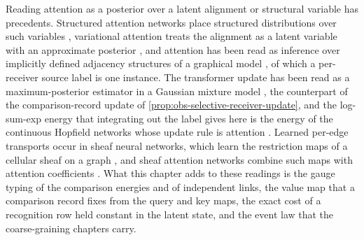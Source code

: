 Reading attention as a posterior over a latent alignment or structural
variable has precedents. Structured attention networks place structured
distributions over such variables \citep{Kim2017StructuredAttention},
variational attention treats the alignment as a latent variable with an
approximate posterior \citep{Deng2018LatentAlignment}, and attention has been
read as inference over implicitly defined adjacency structures of a graphical
model \citep{Singh2023ImplicitStructuralInference}, of which a per-receiver
source label is one instance. The transformer update has been read as a
maximum-posterior estimator in a Gaussian mixture model
\citep{Movellan2020ProbabilisticTransformers}, the counterpart of the
comparison-record update of \cref{prop:obs-selective-receiver-update}, and the
log-sum-exp energy that integrating out the label gives here is the energy of
the continuous Hopfield networks whose update rule is attention
\citep{ramsauer2021hopfield}. Learned per-edge transports occur in sheaf
neural networks, which learn the restriction maps of a cellular sheaf on a
graph \citep{Bodnar2022NeuralSheafDiffusion}, and sheaf attention networks
combine such maps with attention coefficients
\citep{Barbero2022SheafAttention}. What this chapter adds to these readings is
the gauge typing of the comparison energies and of independent links, the
value map that a comparison record fixes from the query and key maps, the
exact cost of a recognition row held constant in the latent state, and the
event law that the coarse-graining chapters carry.

